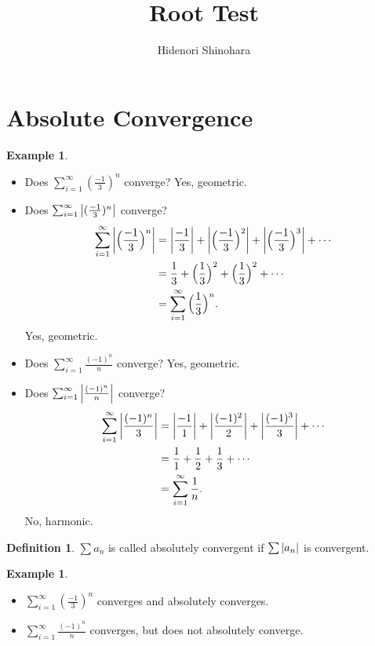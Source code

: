 \documentclass[12pt, psamsfonts]{amsart}
\theoremstyle{definition}
\newtheorem{defn}[thm]{Definition}
\newtheorem{exmp}[thm]{Example}
\theoremstyle{remark}
\numberwithin{equation}{section}
\begin{document}
\title{Root Test}
\author{Hidenori Shinohara}
\maketitle

\section{Absolute Convergence}

\begin{exmp}
$ $
  \begin{itemize}
    \item
      Does $\sum_{i=1}^{\infty} (\frac{-1}{3})^n$ converge?
      Yes, geometric.
    \item
      Does $\sum_{i=1}^{\infty} \abs{(\frac{-1}{3})^n}$ converge?
      \begin{align*}
        \sum_{i=1}^{\infty} \abs{\Big(\frac{-1}{3}\Big)^n}
          &= \abs{\frac{-1}{3}} + \abs{\Big(\frac{-1}{3}\Big)^2} + \abs{\Big(\frac{-1}{3}\Big)^3} + \cdots \\
          &= \frac{1}{3} + \Big(\frac{1}{3}\Big)^2 + \Big(\frac{1}{3}\Big)^2 + \cdots \\
          &= \sum_{i=1}^{\infty} \Big(\frac{1}{3}\Big)^n.
      \end{align*}
      Yes, geometric.
    \item
      Does $\sum_{i=1}^{\infty} \frac{(-1)^n}{n}$ converge?
      Yes, geometric.
    \item
      Does $\sum_{i=1}^{\infty} \abs{\frac{(-1)^n}{n}}$ converge?
      \begin{align*}
        \sum_{i=1}^{\infty} \abs{\frac{(-1)^n}{3}}
          &= \abs{\frac{-1}{1}} + \abs{\frac{(-1)^2}{2}} + \abs{\frac{(-1)^3}{3}} + \cdots \\
          &= \frac{1}{1} + \frac{1}{2} + \frac{1}{3} + \cdots \\
          &= \sum_{i=1}^{\infty} \frac{1}{n}.
      \end{align*}
      No, harmonic.
  \end{itemize}
\end{exmp}

\begin{defn}
  $\sum a_n$ is called absolutely convergent if $\sum \abs{a_n}$ is convergent.
\end{defn}

\begin{exmp}
$ $
  \begin{itemize}
    \item
      $\sum_{i=1}^{\infty} (\frac{-1}{3})^n$ converges and absolutely converges.
    \item
      $\sum_{i=1}^{\infty} \frac{(-1)^n}{n}$ converges, but does not absolutely converge.
  \end{itemize}
\end{exmp}
\end{document}
